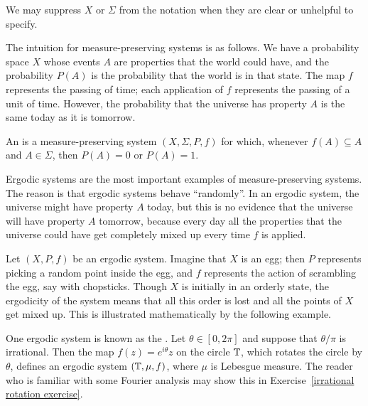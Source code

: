 \begin{subsec}
We may suppress $X$ or $\Sigma$ from the notation when they are clear or unhelpful to specify.
\end{subsec}

\begin{subsec}
The intuition for measure-preserving systems is as follows.
We have a probability space $X$ whose events $A$ are properties that the world could have, and the probability $P(A)$ is the probability that the world is in that state.
The map $f$ represents the passing of time; each application of $f$ represents the passing of a unit of time.
However, the probability that the universe has property $A$ is the same today as it is tomorrow.
\end{subsec}

\begin{definition}
An  is a measure-preserving system $(X, \Sigma, P, f)$ for which, whenever $f(A) \subseteq A$ and $A \in \Sigma$, then $P(A) = 0$ or $P(A) = 1$.
\end{definition}

\begin{subsec}
Ergodic systems are the most important examples of measure-preserving systems.
The reason is that ergodic systems behave ``randomly''.
In an ergodic system, the universe might have property $A$ today, but this is no evidence that the universe will have property $A$ tomorrow, because every day all the properties that the universe could have get completely mixed up every time $f$ is applied.

Let $(X, P, f)$ be an ergodic system.
Imagine that $X$ is an egg; then $P$ represents picking a random point inside the egg, and $f$ represents the action of scrambling the egg, say with chopsticks.
Though $X$ is initially in an orderly state, the ergodicity of the system means that all this order is lost and all the points of $X$ get mixed up.
This is illustrated mathematically by the following example.
\end{subsec}

\begin{example}
One ergodic system is known as the .
Let $\theta \in [0, 2\pi]$ and suppose that $\theta/\pi$ is irrational.
Then the map $f(z) = e^{i\theta}z$ on the circle $\mathbb{T}$, which rotates the circle by $\theta$, defines an ergodic system $(\mathbb{T}, \mu, f)$, where $\mu$ is Lebesgue measure.
The reader who is familiar with some Fourier analysis may show this in Exercise~\ref{irrational rotation exercise}.
\end{example}

